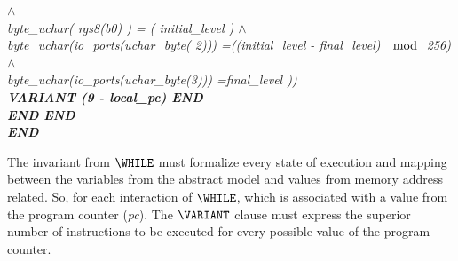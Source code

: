 {\begin{sloppypar}
$\land$\\
\hspace*{1.10in}\it byte\_uchar\rm ( \it rgs8\rm (\it b0\rm ) \rm ) \rm = \rm ( \it initial\_level \rm )
$\land$\\
\hspace*{1.10in}\it byte\_uchar\rm (\it io\_ports\rm (\it uchar\_byte\rm (\rm
2\rm )\rm )\rm ) \rm =\hspace*{0.10in}\rm (\rm (\it initial\_level \rm - \it
final\_level\rm )  $\mod$  \rm 2\rm 5\rm 6\rm )\\ \hspace*{1.10in} $\land$\\
\hspace*{1.10in}\it byte\_uchar\rm (\it io\_ports\rm (\it uchar\_byte\rm (\rm 3\rm )\rm )\rm ) \rm
=\hspace*{0.10in}\it final\_level \rm )\rm )\\
\hspace*{0.70in}\bf VARIANT \rm (\rm 9 \rm - \it local\_pc\rm ) \bf END\hspace*{0.50in}\\
\hspace*{0.70in}\bf END
\hspace*{0.20in}\bf END\\
\hspace*{0.40in}\bf END
\end{sloppypar}
}


% 

The invariant from $\WHILE$ must formalize every state of execution and mapping
between the variables from the abstract model and values from memory address
related. So, for each interaction of $\WHILE$, which  is associated with a
value from the program counter (\textit{pc}). The $\VARIANT$ clause must express
the superior number of instructions to be executed for every possible value of
the program counter.



